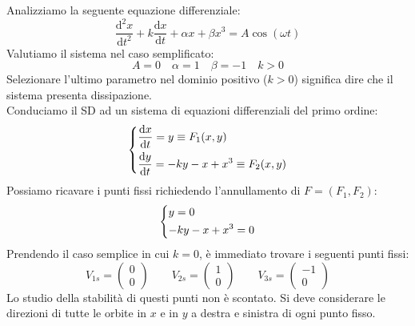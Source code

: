 \begin{exmp}
    Analizziamo la seguente equazione differenziale:
    \[
	\frac{\text{d} ^2x}{\text{d} t^2} + k \frac{\text{d} x}{\text{d} t} + \alpha x + \beta x^3=A\cos (\omega t)
    \] 
    Valutiamo il sistema nel caso semplificato:
    \[
        A = 0 \quad \alpha  = 1 \quad \beta  = -1 \quad k > 0
    \] 
    Selezionare l'ultimo parametro nel dominio positivo ($k>0$) significa dire che il sistema presenta dissipazione.\\
    Conduciamo il SD ad un sistema di equazioni differenziali del primo ordine:
    \[\begin{dcases}
	\frac{\text{d} x}{\text{d} t} = y \equiv F_1(x, y)\\
	\frac{\text{d} y}{\text{d} t} = -ky - x + x^3 \equiv F_2(x, y)
    \end{dcases}\] 
    Possiamo ricavare i punti fissi richiedendo l'annullamento di $F = (F_1, F_2)$:
    \[\begin{dcases}
        y = 0\\
	-ky - x + x^3 = 0
    \end{dcases}\] 
    Prendendo il caso semplice in cui $k = 0$, è immediato trovare i seguenti punti fissi:
    \[
        V_{1s} = \begin{pmatrix} 0 \\ 0 \end{pmatrix} \qquad
        V_{2s} = \begin{pmatrix} 1 \\ 0 \end{pmatrix} \qquad
        V_{3s} = \begin{pmatrix} -1 \\ 0 \end{pmatrix}
    \] 
    Lo studio della stabilità di questi punti non è scontato. Si deve considerare le direzioni di tutte le orbite in $x$ e in $y$ a destra e sinistra di ogni punto fisso.
\end{exmp}
\noindent
